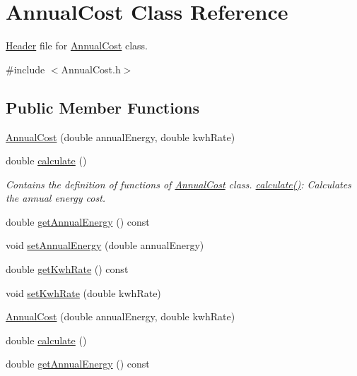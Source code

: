 \hypertarget{class_annual_cost}{}\section{Annual\+Cost Class Reference}
\label{class_annual_cost}


\hyperlink{class_header}{Header} file for \hyperlink{class_annual_cost}{Annual\+Cost} class.  




{\ttfamily \#include $<$Annual\+Cost.\+h$>$}

\subsection*{Public Member Functions}
\begin{DoxyCompactItemize}
\item 
\hyperlink{class_annual_cost_a723513a7074d1799e2bf410b60b3146f}{Annual\+Cost} (double annual\+Energy, double kwh\+Rate)
\item 
double \hyperlink{class_annual_cost_adb12b66af50d01746c3f6f0d430b1fdd}{calculate} ()
\begin{DoxyCompactList}\small\item\em Contains the definition of functions of \hyperlink{class_annual_cost}{Annual\+Cost} class. \hyperlink{class_annual_cost_adb12b66af50d01746c3f6f0d430b1fdd}{calculate()}\+: Calculates the annual energy cost. \end{DoxyCompactList}\item 
double \hyperlink{class_annual_cost_a0e217b7df05e6a03503e14d96570a192}{get\+Annual\+Energy} () const
\item 
void \hyperlink{class_annual_cost_a4379cc7b591abefb2302d74c57227357}{set\+Annual\+Energy} (double annual\+Energy)
\item 
double \hyperlink{class_annual_cost_ac01ed415360b6f52f61ec8a581333c29}{get\+Kwh\+Rate} () const
\item 
void \hyperlink{class_annual_cost_a45a1259c9912c7202dff446c290210e9}{set\+Kwh\+Rate} (double kwh\+Rate)
\item 
\hyperlink{class_annual_cost_a723513a7074d1799e2bf410b60b3146f}{Annual\+Cost} (double annual\+Energy, double kwh\+Rate)
\item 
double \hyperlink{class_annual_cost_adb12b66af50d01746c3f6f0d430b1fdd}{calculate} ()
\item 
double \hyperlink{class_annual_cost_a0e217b7df05e6a03503e14d96570a192}{get\+Annual\+Energy} () const
\item 

\end{DoxyCompactItemize}
